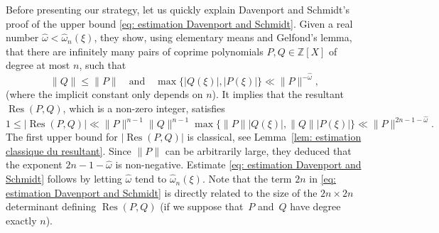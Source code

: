 \documentclass[JEP,XML,SOM,Unicode,NoFloatCountersInSection,published]{cedram}
\DeclareMathOperator\Res{Res}
\newcommand\bZ{\mathbb{Z}}
\newcommand\homega{\widehat{\omega}}\newcommand\HH{\mathcal{H}}
\newcommand{\normH}[1]{\|#1\|}
\newcommand\AND{\quad\text{and}\quad}
\theoremstyle{definition}
\theoremstyle{plain}
\begin{document}
Before presenting our strategy, let us quickly explain Davenport and Schmidt's proof of the upper bound \eqref{eq: estimation Davenport and Schmidt}. Given a real number $\homega < \homega_n(\xi)$, they show, using elementary means and Gelfond's lemma, that there are infinitely many pairs of coprime polynomials $P,Q\in \bZ[X]$ of degree at most $n$, such that
\[
\normH{Q} \leq \normH{P} \AND \max\{|Q(\xi)|, |P(\xi)|\} \ll \normH{P}^{-\homega},
\]
(where the implicit constant only depends on $n$). It implies that the resultant $\Res(P,Q)$, which is a non-zero integer, satisfies
\[
1 \leq |\Res(P,Q)| \ll \normH{P}^{n-1}\normH{Q}^{n-1} \max\big\{\normH{P}|Q(\xi)|, \normH{Q}|P(\xi)| \big\} \ll \normH{P}^{2n-1-\homega}.
\]
The first upper bound for $|\Res(P,Q)|$ is classical, see Lemma~\ref{lem: estimation classique du resultant}. Since $\normH{P}$ can be arbitrarily large, they deduced that the exponent $2n-1-\homega$ is non-negative. Estimate \eqref{eq: estimation Davenport and Schmidt} follows by letting $\homega$ tend to $\homega_n(\xi)$. Note that the term $2n$ in \eqref{eq: estimation Davenport and Schmidt} is directly related to the size of the $2n\times2n$ determinant defining $\Res(P,Q)$ (if we suppose that~$P$ and~$Q$ have degree exactly $n$).
\end{document}
